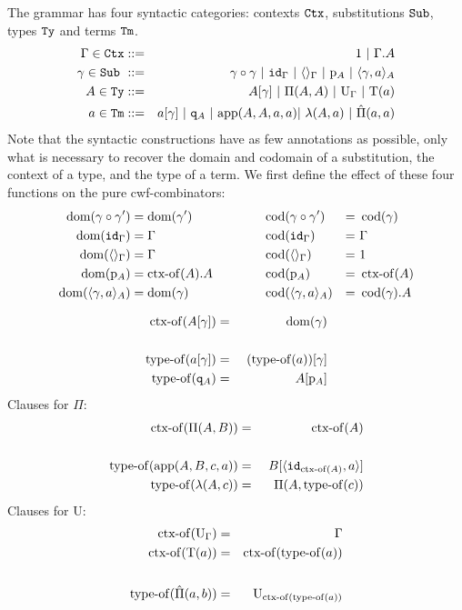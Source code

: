 \documentclass{lmcs}
\def\UU{\mathrm{U}}
\def\Ta{\mathrm{T}}
\def\Pihat{\hat{\Pi}}
\begin{document}
The grammar has four syntactic categories: contexts ${\tt Ctx}$,
substitutions ${\tt Sub}$, types ${\tt Ty}$ and terms ${\tt Tm}$.
\begin{eqnarray*}
\Gamma \in \RawCtx &::=& 1  \ |\ \Gamma.A\\
\gamma \in \RawSub \ &::=& \gamma \circ \gamma \ |\ \id_\Gamma \ |\ \langle\rangle_\Gamma \ |\ \p_{A} \ |\ \langle \gamma, a \rangle_A\\
A \in \RawTy &::=& A[\gamma]   \ |\  \Pi(A,A)\ |\  \UU_\Gamma  \ |\  \Ta(a)\\
a \in \RawTm &::=& a[\gamma] \ |\ \qI_A\ |\  \ap(A,A,a,a) |\ \lambda(A,a)\ |\ \hat{\Pi}(a,a)
\end{eqnarray*}
Note that the syntactic constructions have as few annotations as possible, only what is
necessary to recover the domain and codomain of a substitution, the context of a type, and the type of a term. We first define the effect of these four functions on the pure cwf-combinators:
\begin{align*}
\operatorname{dom}(\gamma \circ \gamma') &= \operatorname{dom}(\gamma') \quad&\quad\quad & \operatorname{cod}(\gamma \circ \gamma') &=&\  \operatorname{cod}(\gamma)\\
\operatorname{dom}({\tt id}_\Gamma) &= \Gamma\quad& &\operatorname{cod}({\tt id}_\Gamma) &=&\  \Gamma\\
\operatorname{dom}(\langle\rangle_\Gamma) &= \Gamma\quad&&\operatorname{cod}(\langle\rangle_\Gamma) &=&\  1\\
\operatorname{dom}(\mathrm{p}_{A}) &= \operatorname{ctx-of}(A).A\quad&&\operatorname{cod}(\mathrm{p}_{A}) &=&\  \operatorname{ctx-of}(A) \\
\operatorname{dom}(\langle \gamma, a \rangle_A) &= \operatorname{dom}(\gamma)\quad&&\operatorname{cod}(\langle \gamma, a \rangle_A) &=&\  \operatorname{cod}(\gamma).A
\end{align*}

\begin{eqnarray*}
\operatorname{ctx-of}(A[\gamma]) &=& \operatorname{dom}(\gamma)\\
&&\\
\operatorname{type-of}(a[\gamma]) &=&\ (\operatorname{type-of}(a))[\gamma]\\
\operatorname{type-of}({\tt q}_A) &=&\ A[\mathrm{p}_{A}]
\end{eqnarray*}
Clauses for $\Pi$:
\begin{eqnarray*}
\operatorname{ctx-of}(\Pi(A,B)) &=& \operatorname{ctx-of}(A)\\
&&\\
\operatorname{type-of}(\mathrm{app}(A,B,c,a)) &=&\ B[\langle {\tt id}_{\operatorname{ctx-of}(A)},a \rangle ]\\
\quad \operatorname{type-of}(\lambda(A,c)) &=& \Pi(A,\operatorname{type-of}(c))
\end{eqnarray*}
Clauses for $\UU$:
\begin{eqnarray*}
\ctxof(\UU_\Gamma) &=& \Gamma\\
\ctxof(\Ta(a)) &=& \ctxof(\typeof(a))\\
&&\\
\typeof(\Pihat(a,b))&=&\UU_{\ctxof(  \typeof(a))}
\end{eqnarray*}
\end{document}

